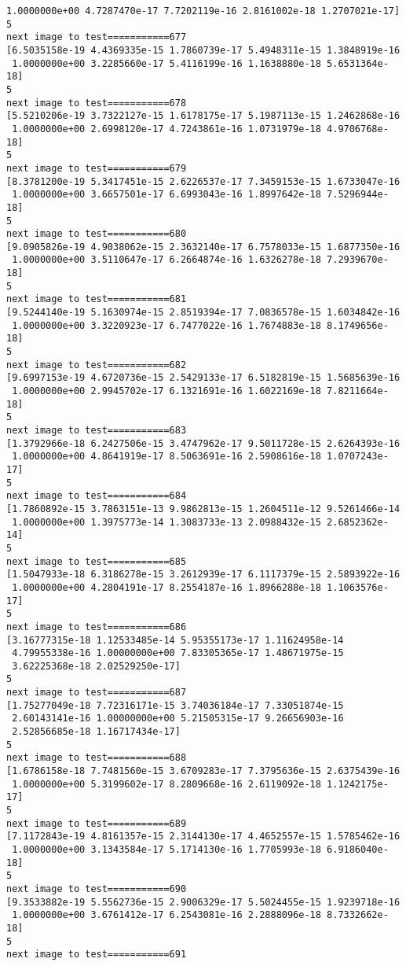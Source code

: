 \documentclass[11pt]{article}
\begin{document}
\begin{Verbatim}[commandchars=\\\{\}]
 1.0000000e+00 4.7287470e-17 7.7202119e-16 2.8161002e-18 1.2707021e-17]
5
next image to test===========677
[6.5035158e-19 4.4369335e-15 1.7860739e-17 5.4948311e-15 1.3848919e-16
 1.0000000e+00 3.2285660e-17 5.4116199e-16 1.1638880e-18 5.6531364e-18]
5
next image to test===========678
[5.5210206e-19 3.7322127e-15 1.6178175e-17 5.1987113e-15 1.2462868e-16
 1.0000000e+00 2.6998120e-17 4.7243861e-16 1.0731979e-18 4.9706768e-18]
5
next image to test===========679
[8.3781200e-19 5.3417451e-15 2.6226537e-17 7.3459153e-15 1.6733047e-16
 1.0000000e+00 3.6657501e-17 6.6993043e-16 1.8997642e-18 7.5296944e-18]
5
next image to test===========680
[9.0905826e-19 4.9038062e-15 2.3632140e-17 6.7578033e-15 1.6877350e-16
 1.0000000e+00 3.5110647e-17 6.2664874e-16 1.6326278e-18 7.2939670e-18]
5
next image to test===========681
[9.5244140e-19 5.1630974e-15 2.8519394e-17 7.0836578e-15 1.6034842e-16
 1.0000000e+00 3.3220923e-17 6.7477022e-16 1.7674883e-18 8.1749656e-18]
5
next image to test===========682
[9.6997153e-19 4.6720736e-15 2.5429133e-17 6.5182819e-15 1.5685639e-16
 1.0000000e+00 2.9945702e-17 6.1321691e-16 1.6022169e-18 7.8211664e-18]
5
next image to test===========683
[1.3792966e-18 6.2427506e-15 3.4747962e-17 9.5011728e-15 2.6264393e-16
 1.0000000e+00 4.8641919e-17 8.5063691e-16 2.5908616e-18 1.0707243e-17]
5
next image to test===========684
[1.7860892e-15 3.7863151e-13 9.9862813e-15 1.2604511e-12 9.5261466e-14
 1.0000000e+00 1.3975773e-14 1.3083733e-13 2.0988432e-15 2.6852362e-14]
5
next image to test===========685
[1.5047933e-18 6.3186278e-15 3.2612939e-17 6.1117379e-15 2.5893922e-16
 1.0000000e+00 4.2804191e-17 8.2554187e-16 1.8966288e-18 1.1063576e-17]
5
next image to test===========686
[3.16777315e-18 1.12533485e-14 5.95355173e-17 1.11624958e-14
 4.79955338e-16 1.00000000e+00 7.83305365e-17 1.48671975e-15
 3.62225368e-18 2.02529250e-17]
5
next image to test===========687
[1.75277049e-18 7.72316171e-15 3.74036184e-17 7.33051874e-15
 2.60143141e-16 1.00000000e+00 5.21505315e-17 9.26656903e-16
 2.52856685e-18 1.16717434e-17]
5
next image to test===========688
[1.6786158e-18 7.7481560e-15 3.6709283e-17 7.3795636e-15 2.6375439e-16
 1.0000000e+00 5.3199602e-17 8.2809668e-16 2.6119092e-18 1.1242175e-17]
5
next image to test===========689
[7.1172843e-19 4.8161357e-15 2.3144130e-17 4.4652557e-15 1.5785462e-16
 1.0000000e+00 3.1343584e-17 5.1714130e-16 1.7705993e-18 6.9186040e-18]
5
next image to test===========690
[9.3533882e-19 5.5562736e-15 2.9006329e-17 5.5024455e-15 1.9239718e-16
 1.0000000e+00 3.6761412e-17 6.2543081e-16 2.2888096e-18 8.7332662e-18]
5
next image to test===========691

\end{Verbatim}
\end{document}
